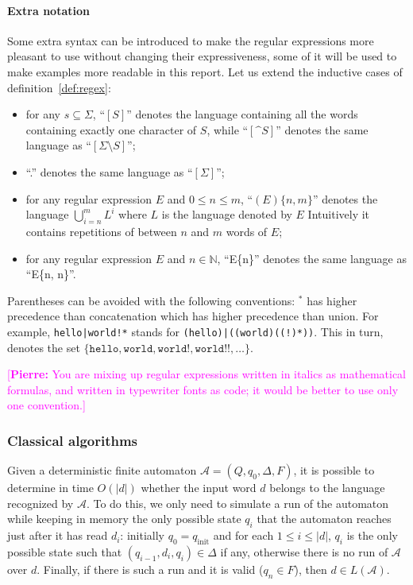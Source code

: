 \documentclass[12px]{article}
\theoremstyle{definition}
\newcommand{\pierre}[1]{\textcolor{magenta}{[\textbf{Pierre:} #1]}}
\begin{document}
        \paragraph{Extra notation}
          Some extra syntax can be introduced to make the regular expressions
          more pleasant to use without changing their expressiveness, some of
          it will be used to make examples more readable in this report. Let us
          extend the inductive cases of definition~\ref{def:regex}:
            \begin{itemize}
              \item for any $s \subseteq \Sigma$, ``$[S]$'' denotes the
                language containing all the words containing exactly one
                character of $S$, while ``$[\texttt{\textasciicircum}S]$''
                denotes the same language as ``$[\Sigma \setminus S]$'';
              \item ``.'' denotes the same language as ``$[\Sigma]$'';
              \item for any regular expression $E$ and $0 \leq n \leq m$,
                ``$(E)\{n,m\}$'' denotes the language $\bigcup_{i=n}^m
                L^i$ where $L$ is the language denoted by $E$ Intuitively it
                contains repetitions of between $n$ and $m$ words of $E$;
              \item for any regular expression $E$ and $n \in \mathbb{N}$,
                ``E\{n\}'' denotes the same language as ``E\{n, n\}''.
            \end{itemize}

          Parentheses can be avoided with the following conventions: ${}^*$ has
          higher precedence than concatenation which has higher precedence than
          union. For example, \texttt{hello|world!*} stands for
          \texttt{(hello)|((world)((!)*))}. This in turn, denotes the set
          $\{\texttt{hello}, \texttt{world}, \texttt{world!}, \texttt{world!!},
          \ldots\}$.

          \pierre{You are mixing up regular expressions written in
          italics as mathematical formulas, and written in typewriter
          fonts as code; it would be better to use only one
          convention.}

      \subsubsection{Classical algorithms}

        Given a deterministic finite automaton $\mathcal{A} = (Q, q_0, \Delta,
        F)$, it is possible to determine in time $O(|d|)$ whether the input
        word $d$ belongs to the language recognized by $\mathcal{A}$. To do
        this, we only need to simulate a run of the automaton while keeping in
        memory the only possible state $q_i$ that the automaton reaches just
        after it has read $d_i$: initially $q_0 = q_\text{init}$ and for each
        $1 \leq i \leq |d|$, $q_{i}$ is the only possible state such that
        $(q_{i-1}, d_i, q_i) \in \Delta$ if any, otherwise there is no run of
        $\mathcal{A}$ over $d$. Finally, if there is such a run and it is valid
        ($q_n \in F$), then $d \in L(\mathcal{A})$.
\end{document}
